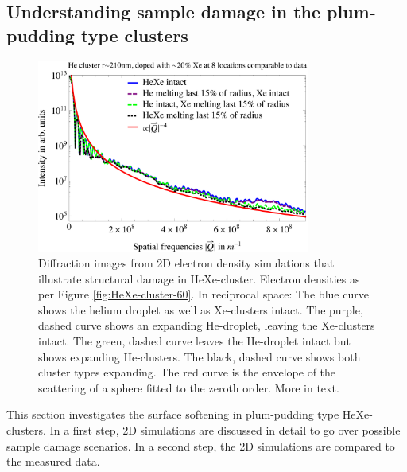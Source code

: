 \subsection{Understanding sample damage in the plum-pudding type clusters}\label{sec:helium-xenon-data}
\begin{figure}
	\centering
		\includegraphics[width=0.8\textwidth]{images/results/simulations-damage-explain2.png}
	\caption[Simulated structural damage scenarios in HeXe-clusters.]{Diffraction images from 2D electron density simulations that illustrate structural damage in HeXe-cluster. Electron densities as per Figure \ref{fig:HeXe-cluster-60}. In reciprocal space: The blue curve shows the helium droplet as well as Xe-clusters intact. The purple, dashed curve shows an expanding He-droplet, leaving the Xe-clusters intact. The green, dashed curve leaves the He-droplet intact but shows expanding He-clusters. The black, dashed curve shows both cluster types expanding. The red curve is the envelope of the scattering of a sphere fitted to the zeroth order. More in text.}
	\label{fig:simulations-damage-explain}
\end{figure}
%
This section investigates the surface softening in plum-pudding type HeXe-clusters. In a first step, 2D simulations are discussed in detail to go over possible sample damage scenarios. In a second step, the 2D simulations are compared to the measured data.
